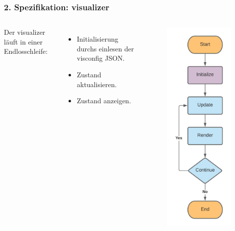\documentclass{presentation}
\begin{document}
\begin{frame}[allowframebreaks]
	\frametitle{2. Spezifikation: visualizer}
	\begin{columns}
		Der visualizer läuft in einer Endlosschleife:
		\bigskip
		\begin{itemize}
			\item Initialisierung durchs einlesen der visconfig JSON.
			\item Zustand aktualisieren.
			\item Zustand anzeigen.
		\end{itemize}
		\begin{figure}
			\includegraphics[scale=0.45]{visualizer_render_loop.jpg}
		\end{figure}
	\end{columns}


\end{frame}
\end{document}
